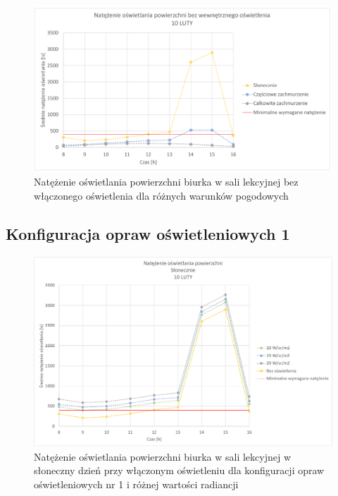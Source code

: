 \documentclass[a4paper,12pt]{article}
\begin{document}
	\begin{figure}[h!]
		\centering
		\includegraphics[width=\linewidth]{Wykresy/bez_oswietlenia_1.pdf}
		\caption{Natężenie oświetlania powierzchni biurka w sali lekcyjnej bez włączonego oświetlenia dla różnych warunków pogodowych }
		\label{bez_oswietlenia_1}
	\end{figure}

	\subsection{Konfiguracja opraw oświetleniowych 1}
	\label{sec:oswietlenie_1}

	\begin{figure}[!ht]
		\centering
		\includegraphics[width=\linewidth]{Wykresy/oswietlenie_1_slonecznie.pdf}
		\caption{Natężenie oświetlania powierzchni biurka w sali lekcyjnej w słoneczny dzień przy włączonym oświetleniu dla konfiguracji opraw oświetleniowych nr 1 i różnej wartości radiancji}
		\label{oswietlenie_1_slonecznie}
	\end{figure}
\end{document}
